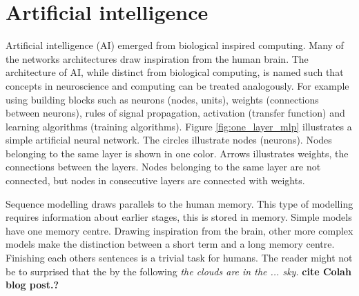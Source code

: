 \documentclass{article}
\begin{document}
\section{Artificial intelligence}

Artificial intelligence (AI) emerged from biological inspired computing. Many of the networks architectures draw inspiration from the human brain. The architecture of AI, while distinct from biological computing, is named such that concepts in neuroscience and computing can be treated analogously. For example using building blocks such as neurons (nodes, units), weights (connections between neurons), rules of signal propagation, activation (transfer function) and learning algorithms (training algorithms). Figure \ref{fig:one_layer_mlp} illustrates a simple artificial neural network. 
The circles illustrate nodes (neurons). Nodes belonging to the same layer is shown in one color. Arrows illustrates weights, the connections between the layers. Nodes belonging to the same layer are not connected, but nodes in consecutive layers are connected with weights. 

Sequence modelling draws parallels to the human memory. This type of modelling requires information about earlier stages, this is stored in memory. 
Simple models have one memory centre. Drawing inspiration from the brain, other more complex models make the distinction between a short term and a long memory centre. Finishing each others sentences is a trivial task for humans. The reader might not be to surprised that the by the following \textit{the clouds are in the ... sky.} \textbf{cite Colah blog post.?}
\end{document}
